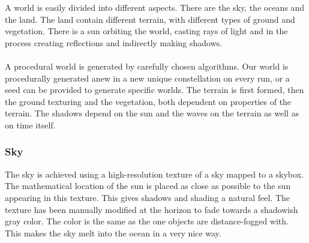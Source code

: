 
A world is easily divided into different aspects. There are the sky, the oceans and the land. The land contain different terrain, with different types of ground and vegetation. There is a sun orbiting the world, casting rays of light and in the process creating reflections and indirectly making shadows.\\
\\
A procedural world is generated by carefully chosen algorithms. Our world is procedurally generated anew in a new unique constellation on every run, or a seed can be provided to generate specific worlds. The terrain is first formed, then the ground texturing and the vegetation, both dependent on properties of the terrain. The shadows depend on the sun and the waves on the terrain as well as on time itself.

\subsubsection{Sky}
The sky is achieved using a high-resolution texture of a sky mapped to a skybox. The mathematical location of the sun is placed as close as possible to the sun appearing in this texture. This gives shadows and shading a natural feel. The texture has been manually modified at the horizon to fade towards a shadowish gray color. The color is the same as the one objects are distance-fogged with. This makes the sky melt into the ocean in a very nice way. 

